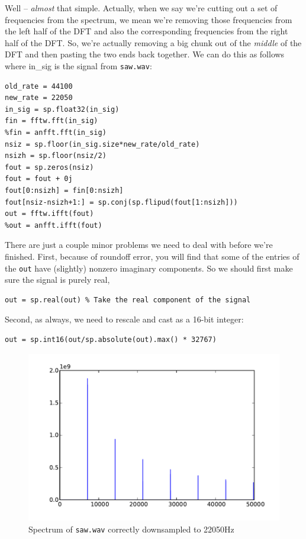 Well -- \emph{almost} that simple. Actually, when we say we're cutting out a set of frequencies from the spectrum, we mean we're removing those frequencies from the left half of the DFT and also the corresponding frequencies from the right half of the DFT. So, we're actually removing a big chunk out of the \emph{middle} of the DFT and then pasting the two ends back together. We can do this as follows where in\_sig is the signal from \texttt{saw.wav}:
\begin{lstlisting}
old_rate = 44100
new_rate = 22050
in_sig = sp.float32(in_sig)
fin = fftw.fft(in_sig)
%fin = anfft.fft(in_sig)
nsiz = sp.floor(in_sig.size*new_rate/old_rate)
nsizh = sp.floor(nsiz/2)
fout = sp.zeros(nsiz)
fout = fout + 0j
fout[0:nsizh] = fin[0:nsizh]
fout[nsiz-nsizh+1:] = sp.conj(sp.flipud(fout[1:nsizh]))
out = fftw.ifft(fout)
%out = anfft.ifft(fout)
\end{lstlisting}
There are just a couple minor problems we need to deal with before we're finished. First, because of roundoff error, you will find that some of the entries of the \texttt{out} have (slightly) nonzero imaginary components.  So we should first make sure the signal is purely real,
\begin{lstlisting}
out = sp.real(out) % Take the real component of the signal
\end{lstlisting}
Second, as always, we need to rescale and cast as a 16-bit integer:
\begin{lstlisting}
out = sp.int16(out/sp.absolute(out).max() * 32767)
\end{lstlisting}


\begin{figure}[ht]\caption{Spectrum of \texttt{saw.wav} correctly downsampled to 22050Hz}\label{sawspecdown2}\centering\includegraphics[width=\textwidth]{sawdownspec}\end{figure}

